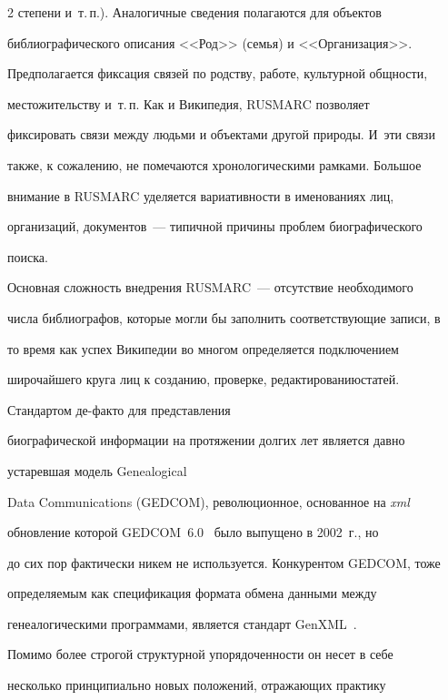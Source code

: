 \begin{multicols}{2}
степени и~т.\,п.). Аналогичные сведения полагаются для объектов 


библиографического описания <<Род>> (семья) и <<Организация>>. 


Предполагается фиксация связей по родству, работе, культурной общности, 


местожительству и~т.\,п. Как и Википедия, RUSMARC позволяет 


фиксировать связи между людьми и объектами другой природы. И~эти связи 


также, к сожалению, не помечаются хронологическими рамками. Большое 


внимание в RUSMARC уделяется вариативности в именованиях лиц, 


организаций, документов~--- типичной причины проблем биографического 


поиска. 


  


  Основная сложность внедрения RUSMARC~--- отсутствие необходимого 


числа библиографов, которые могли бы заполнить соответствующие записи, в 


то время как успех Википедии во многом определя\-ет\-ся подключением 


широчайшего круга лиц к созданию, проверке, редактированию\linebreak статей. 


  


  Стандартом де-фак\-то для представления 


биографической информации на протяжении долгих лет является давно 


устаревшая модель Ge\-ne\-a\-logi\-cal 


Data Communications (\mbox{GEDCOM}), революционное, основанное на \textit{xml} 


обновление которой \mbox{GEDCOM}~6.0~\cite{9mar} было выпущено в 2002~г., но 


до сих пор фактически никем не используется. Конкурентом \mbox{GEDCOM}, тоже 


определяемым как спецификация формата обмена данными между 


генеалогическими программами, является стандарт GenXML~\cite{10mar}. 


Помимо более строгой структурной упорядоченности он несет в себе 


несколько принципиально новых положений, отражающих практику 



\end{multicols}
